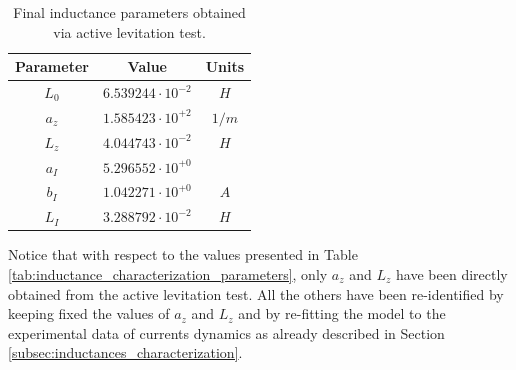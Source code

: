 \begin{table}[H]
    \centering
    \begin{tabular}{|c|c|c|}
        \hline
        \textbf{Parameter} & \textbf{Value}           & \textbf{Units} \\
        \hline
        $L_0$              & $6.539244 \cdot 10^{-2}$ & $H$            \\
        $a_z$              & $1.585423 \cdot 10^{+2}$ & $1/m$          \\
        $L_z$              & $4.044743 \cdot 10^{-2}$ & $H$            \\
        $a_I$              & $5.296552 \cdot 10^{+0}$ &                \\
        $b_I$              & $1.042271 \cdot 10^{+0}$ & $A$            \\
        $L_I$              & $3.288792 \cdot 10^{-2}$ & $H$            \\
        \hline
    \end{tabular}

    \caption{Final inductance parameters obtained via active levitation test.}
    \label{tab:final_inductance_characterization_parameters}

\end{table}

Notice that with respect to the values presented in Table \ref{tab:inductance_characterization_parameters}, only $a_z$ and $L_z$ have been directly obtained from the active levitation test.
All the others have been re-identified by keeping fixed the values of $a_z$ and $L_z$ and by re-fitting the model to the experimental data of currents dynamics as already described in Section \ref{subsec:inductances_characterization}.



